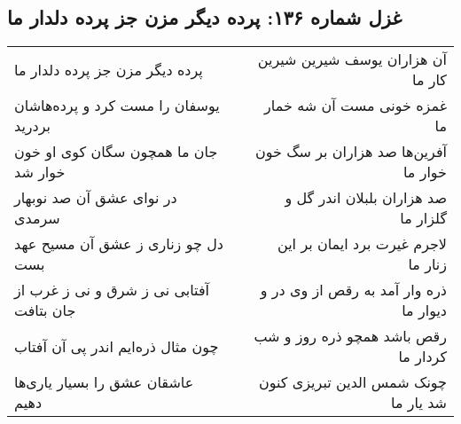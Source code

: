 \begin{center}
\section*{غزل شماره ۱۳۶: پرده دیگر مزن جز پرده دلدار ما}
\label{sec:0136}
\begin{longtable}{l p{0.5cm} r}
پرده دیگر مزن جز پرده دلدار ما
&&
آن هزاران یوسف شیرین شیرین کار ما
\\
یوسفان را مست کرد و پرده‌هاشان بردرید
&&
غمزه خونی مست آن شه خمار ما
\\
جان ما همچون سگان کوی او خون خوار شد
&&
آفرین‌ها صد هزاران بر سگ خون خوار ما
\\
در نوای عشق آن صد نوبهار سرمدی
&&
صد هزاران بلبلان اندر گل و گلزار ما
\\
دل چو زناری ز عشق آن مسیح عهد بست
&&
لاجرم غیرت برد ایمان بر این زنار ما
\\
آفتابی نی ز شرق و نی ز غرب از جان بتافت
&&
ذره وار آمد به رقص از وی در و دیوار ما
\\
چون مثال ذره‌ایم اندر پی آن آفتاب
&&
رقص باشد همچو ذره روز و شب کردار ما
\\
عاشقان عشق را بسیار یاری‌ها دهیم
&&
چونک شمس الدین تبریزی کنون شد یار ما
\\
\end{longtable}
\end{center}
